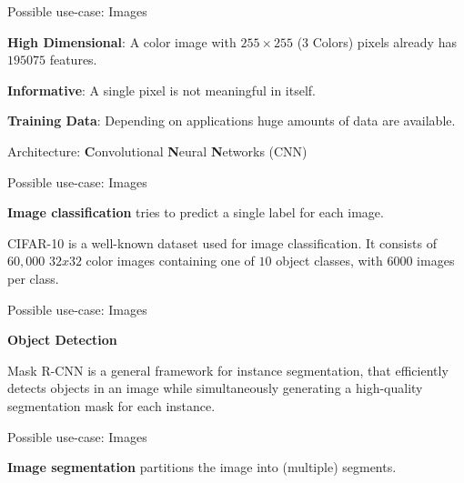 \documentclass[11pt,compress,t,notes=noshow, xcolor=table]{beamer}
\begin{document}
\begin{frame}{Possible use-case: Images}
\begin{itemizeM}
\item \textbf{High Dimensional}: A color image with $255 \times 255$ (3 Colors) pixels already has $195075$ features.
\item \textbf{Informative}: A single pixel is not meaningful in itself.
\item \textbf{Training Data}: Depending on applications huge amounts of data are available.
\end{itemizeM}
Architecture: \textbf{C}onvolutional \textbf{N}eural \textbf{N}etworks (CNN)
\end{frame}


\begin{framei} {Possible use-case: Images}
\item \textbf{Image classification} tries to predict a single label for each image.
\item \footnotesize CIFAR-10 is a well-known dataset used for image classification. It consists of $60,000$ $32x32$ color images containing one of $10$ object classes, with $6000$ images per class. 
\end{framei}


\begin{framei} {Possible use-case: Images}
\item \textbf{Object Detection}
\item \footnotesize Mask R-CNN is a general framework for instance segmentation, that efficiently detects objects in an image while simultaneously generating a high-quality segmentation mask for each instance.
\end{framei}

\begin{framei} {Possible use-case: Images}
\item \textbf{Image segmentation} partitions the image into (multiple) segments.

\end{framei}
\end{document}
